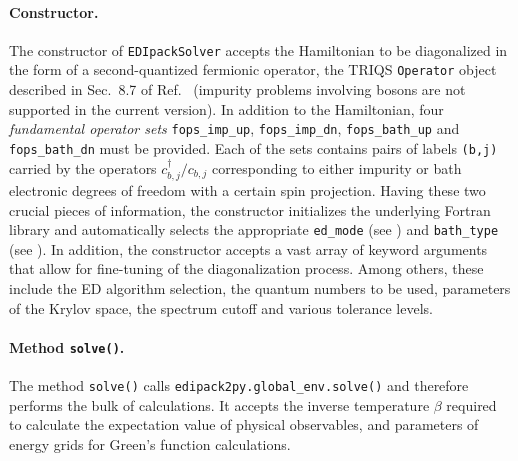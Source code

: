 \documentclass[edipack_sp.tex]{subfiles}
\begin{document}
\paragraph{{\bf Constructor}.}
The constructor of {\tt EDIpackSolver} accepts the Hamiltonian to be diagonalized
in the form of a second-quantized fermionic operator, the TRIQS {\tt Operator}
object described in Sec.~8.7 of Ref.~ (impurity 
problems involving bosons are not supported in the current version). In 
addition to the Hamiltonian, four {\it fundamental operator sets}
{\tt fops\_imp\_up}, {\tt fops\_imp\_dn}, {\tt fops\_bath\_up} and
{\tt fops\_bath\_dn} must be provided.
Each of the sets contains pairs of labels {\tt (b,j)} carried
by the operators $c^\dagger_{b,j} / c_{b,j}$ corresponding to either impurity
or bath electronic degrees of freedom with a certain spin projection.
Having these two crucial pieces of information, the constructor initializes
the underlying Fortran library and automatically selects the appropriate
{\tt ed\_mode} (see ) and
{\tt bath\_type} (see ). In addition, the
constructor accepts a vast array of keyword arguments that allow for fine-tuning of
the diagonalization process. Among others, these include the ED algorithm
selection, the quantum numbers to be used, parameters of the Krylov space,
the spectrum cutoff and various tolerance levels.

\paragraph{{\bf Method {\tt solve()}}.}
The method {\tt solve()} calls
{\tt edipack2py.global\_env.solve()} and therefore performs the bulk of
calculations. It accepts the inverse temperature $\beta$ required to calculate
the expectation value of physical observables, and parameters of energy grids
for Green's function calculations.
\end{document}
